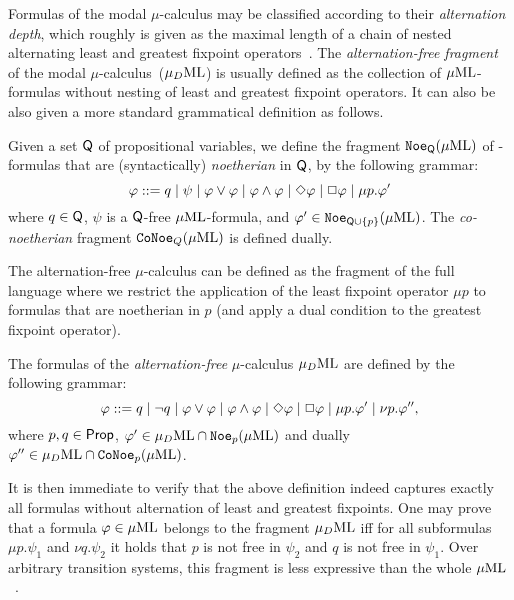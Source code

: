 \bigskip
Formulas of the modal $\mu$-calculus may be classified according to their
\emph{alternation depth}, which roughly is given as the maximal length of
a chain of nested alternating least and greatest fixpoint operators~\cite{Niwinski86}.
The \emph{alternation-free fragment} of the modal $\mu$-calculus~($\mu_{D}\mathrm{ML}$) is 
usually defined as the collection of $\mu\mathrm{ML}$-formulas without nesting of least
and greatest fixpoint operators. 
It can also be also given a more standard grammatical definition as follows.

\begin{definition}
Given a set $\mathsf{Q}$ of propositional variables, we define the fragment 
$\mathtt{Noe}_{\mathsf{Q}}(\mu\mathrm{ML})$ of \muML-formulas that are (syntactically) 
\emph{noetherian} in $\mathsf{Q}$, by the following grammar:
\begin{equation*}
   \varphi \mathrel{::=}  q
   \mid \psi
   \mid \varphi \lor \varphi
   \mid \varphi \land \varphi
     \mid \Diamond \varphi
       \mid \Box \varphi
   \mid \mu p.\varphi'
\end{equation*}
where $q \in \mathsf{Q}$, $\psi$ is a $\mathsf{Q}$-free $\mu\mathrm{ML}$-formula, and 
$\varphi' \in \mathtt{Noe}_{\mathsf{Q}\cup\{p\}}(\mu\mathrm{ML})$. 
The \emph{co-noetherian} fragment $\mathtt{CoNoe}_{Q}(\mu\mathrm{ML})$ is defined dually.
\end{definition}

The alternation-free $\mu$-calculus can be defined as the fragment of the full
language where we restrict the application of the least fixpoint operator $\mu
p$ to formulas that are noetherian in $p$ (and apply a dual condition to the 
greatest fixpoint operator).

\begin{definition}
The formulas of the \emph{alternation-free} $\mu$-calculus $\mu_{D}\mathrm{ML}$ 
are defined by the following grammar:
\begin{equation*}
   \varphi \mathrel{::=}  
      q \mid \neg q  
   \mid \varphi\lor\varphi \mid \varphi\land\varphi 
      \mid \Diamond \varphi
       \mid \Box \varphi
   \mid \mu p. \varphi'    
   \mid \nu p. \varphi'',
\end{equation*} 
where $p,q \in \mathsf{Prop}$, $\varphi' \in \mu_{D}\mathrm{ML} \cap \mathtt{Noe}_{p}(\mu\mathrm{ML})$
and dually $\varphi'' \in \mu_{D}\mathrm{ML} \cap \mathtt{CoNoe}_{p}(\mu\mathrm{ML})$.
\end{definition}

It is then immediate to verify that the above definition indeed captures exactly
all formulas without alternation of least and greatest fixpoints.
One may prove that 
a formula $\varphi \in \mu\mathrm{ML}$ belongs to the fragment $\mu_{D}\mathrm{ML}$ iff for all 
subformulas $\mu p.\psi_1$ and $\nu q.\psi_2$ it holds that $p$ is not free in
$\psi_2$ and $q$ is not free in $\psi_1$.
%
Over arbitrary transition systems, this fragment is less expressive than the 
whole $\mu\mathrm{ML}$~\cite{Park79}. 

